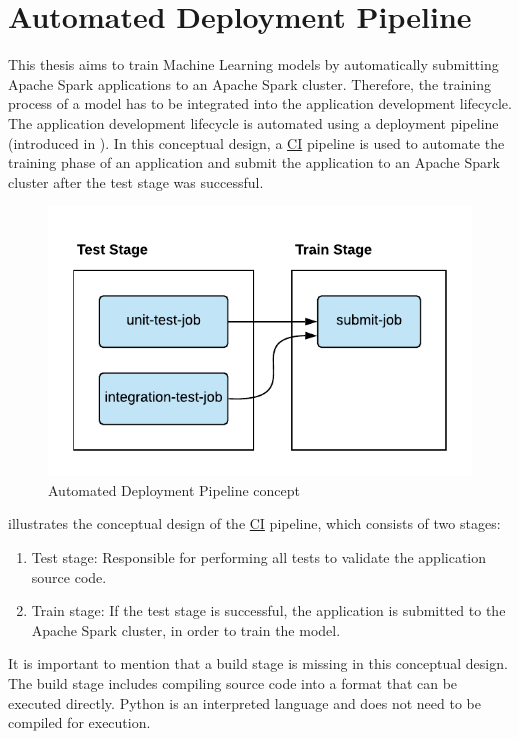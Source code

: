 \section{Automated Deployment Pipeline}
\label{sec:05_pipeline}
This thesis aims to train Machine Learning models by automatically submitting Apache Spark applications to an Apache Spark cluster. Therefore, the training process of a model has to be integrated into the application development lifecycle.
%
The application development lifecycle is automated using a deployment pipeline (introduced in ).
%
In this conceptual design, a \hyperlink{abbr:ci}{CI} pipeline is used to automate the training phase of an application and submit the application to an Apache Spark cluster after the test stage was successful.


\begin{figure}[h]
\centering
\includegraphics[scale=1]{images/05_conceptual_design/automated_deployment_pipeline/ci_cd_concept}
\caption{Automated Deployment Pipeline concept}
\label{fig:05_deployment_concept}
\end{figure}
 illustrates the conceptual design of the \hyperlink{abbr:ci}{CI} pipeline, which consists of two stages:
\begin{enumerate}
\item Test stage: Responsible for performing all tests to validate the application source code.
\item Train stage: If the test stage is successful, the application is submitted to the Apache Spark cluster, in order to train the model.
\end{enumerate}
It is important to mention that a build stage is missing in this conceptual design. The build stage includes compiling source code into a format that can be executed directly.
Python is an interpreted language and does not need to be compiled for execution.


